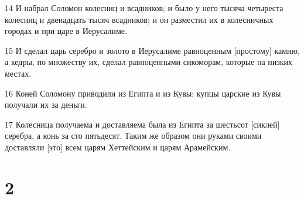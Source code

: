 \par 14 И набрал Соломон колесниц и всадников; и было у него тысяча четыреста колесниц и двенадцать тысяч всадников; и он разместил их в колесничных городах и при царе в Иерусалиме.
\par 15 И сделал царь серебро и золото в Иерусалиме равноценным [простому] камню, а кедры, по множеству их, сделал равноценными сикоморам, которые на низких местах.
\par 16 Коней Соломону приводили из Египта и из Кувы; купцы царские из Кувы получали их за деньги.
\par 17 Колесница получаема и доставляема была из Египта за шестьсот [сиклей] серебра, а конь за сто пятьдесят. Таким же образом они руками своими доставляли [это] всем царям Хеттейским и царям Арамейским.

\chapter{2}

